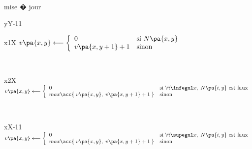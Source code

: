 \begin{xalgorithm}
        \begin{xalgostep}{mise � jour}
        \begin{xfor}{y}{Y-1}{1}
            \begin{xfor}{x}{1}{X}
            $v\pa{x,y} \longleftarrow \left\{ \begin{array} {ll}
                                                0                         & \text{si } N\pa{x,y} \\
                                                v\pa{x,y+1}+1 & \text{sinon}
                                                \end{array} \right.$ 
            \end{xfor} \\
            \begin{xfor}{x}{2}{X}
            $v\pa{x,y} \longleftarrow \left\{ \begin{array} {ll}
                                                0                                                                                       & 
                                                                \text{si } \forall i \infegal x, \; N\pa{i,y} \text{ est faux}\\
                                                max \acc{\; v\pa{x,y}, \; v\pa{x,y+1}+1 \; }        & \text{sinon}
                                                \end{array} \right.$ 
            \end{xfor} \\
            \begin{xfor}{x}{X-1}{1}
            $v\pa{x,y} \longleftarrow \left\{ \begin{array} {ll}
                                                0                                                                                       & 
                                                                \text{si } \forall i \supegal x, \; N\pa{i,y} \text{ est faux}\\
                                                max \acc{\; v\pa{x,y}, \; v\pa{x,y+1}+1 \; }        & \text{sinon}
                                                \end{array} \right.$ 
            \end{xfor}
\end{xfor}
\end{xalgostep}
\end{xalgorithm}
